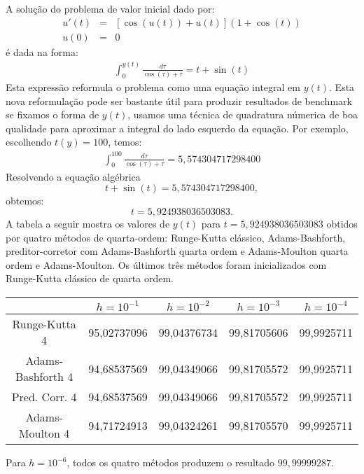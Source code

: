  \begin{ex} A solução do problema de valor inicial dado por:
\begin{eqnarray}
u'(t)&=&\left[\cos\left(u(t)\right)+u(t)\right](1+\cos(t))\\
u(0)&=&0
\end{eqnarray}
é dada na forma:
\begin{eqnarray}
\int_0^{y(t)}\frac{d\tau}{\cos(\tau)+\tau}=t+\sin(t)
\end{eqnarray}
Esta expressão reformula o problema como uma equação integral em $y(t)$. Esta nova reformulação pode ser bastante útil para produzir resultados de benchmark se fixamos o forma de $y(t)$, usamos uma técnica de quadratura númerica de boa qualidade para aproximar a integral do lado esquerdo da equação. Por exemplo, escolhendo $t(y)=100$, temos:
\begin{eqnarray}
\int_0^{100}\frac{d\tau}{\cos(\tau)+\tau}=5,574304717298400
\end{eqnarray}
Resolvendo a equação algébrica
\begin{equation} t+\sin(t)=5,574304717298400, \end{equation}
obtemos:
\begin{equation} t=5,924938036503083. \end{equation}
A tabela a seguir mostra os valores de $y(t)$ para $t=5,924938036503083$ obtidos por quatro métodos de quarta-ordem: Runge-Kutta clássico, Adams-Bashforth, preditor-corretor com Adams-Bashforth quarta ordem e Adams-Moulton quarta ordem e Adams-Moulton. Os últimos três métodos foram inicializados com Runge-Kutta clássico de quarta ordem.

\begin{tabular}{|c|c|c|c|c|}
 \hline
 &$h=10^{-1}$&$h=10^{-2}$&$h=10^{-3}$&$h=10^{-4}$\\
 \hline
  Runge-Kutta 4 &       95,02737096& 99,04376734& 99,81705606 & 99,9925711 \\
  \hline
  Adams-Bashforth 4 &   94,68537569& 99,04349066& 99,81705572& 99,9925711\\
  \hline
  Pred. Corr. 4 &       94,68537569& 99,04349066& 99,81705572& 99,9925711\\
  \hline
  Adams-Moulton 4 &     94,71724913& 99,04324261& 99,81705570& 99,9925711\\
\hline
 \end{tabular}
Para $h=10^{-6}$, todos os quatro métodos produzem o resultado $99,99999287$.
\end{ex}

